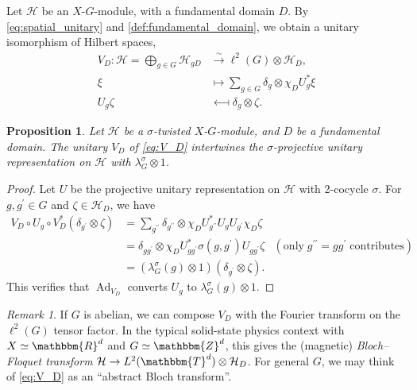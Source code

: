 \documentclass{amsart}
\numberwithin{figure}{section}
\numberwithin{equation}{section}
\numberwithin{table}{section}
\theoremstyle{plain}
\newtheorem{proposition}[equation]{Proposition}
\theoremstyle{definition}
\theoremstyle{remark}
\newtheorem{remark}[equation]{Remark}
\theoremstyle{nonumber}
\newcommand{\Z}{\mathbb{Z}}
\newcommand{\R}{\mathbb{R}}
\newcommand{\T}{\mathbb{T}}
\newcommand{\Ad}{\operatorname{Ad}} %
\renewcommand{\mathbb}{\mathbbm} %
\begin{document}
\medskip
Let \( \mathcal{H} \) be an \( X \)-\( G \)-module,
with a fundamental domain \( D \).
By \eqref{eq:spatial_unitary} and \cref{def:fundamental_domain}, 
we obtain a unitary isomorphism of Hilbert spaces,
\begin{equation}\label{eq:V_D}
\begin{aligned}
V_{D}\colon\mathcal{H}=\bigoplus_{g\in G} \mathcal{H}_{gD}
&\overset{\sim}{\longrightarrow}\ell^2(G)\otimes\mathcal{H}_{D},\\
\xi&\longmapsto
\sum_{g\in G}\delta_g\otimes\chi_{D}U_g^*\xi\\
U_g\zeta &\longmapsfrom \delta_g\otimes\zeta.
\end{aligned}
\end{equation}

\begin{proposition}\label{prop:V_D_intertwine}
Let \( \mathcal{H} \) be a $\sigma$-twisted \( X \)-\( G \)-module, and
$D$ be a fundamental domain. The unitary $V_D$ of \eqref{eq:V_D}
intertwines the $\sigma$-projective unitary representation on $\mathcal{H}$
with $\lambda_G^\sigma\otimes 1$.
\end{proposition}
\begin{proof}
Let $U$ be the projective unitary representation on $\mathcal{H}$ with 2-cocycle $\sigma$.
For $g, g^\prime\in G$ and $\zeta\in \mathcal{H}_D$, we have
\begin{align*}
V_D\circ U_{g}\circ V_D^*(\delta_{g^\prime}\otimes \zeta)
&=\sum_{g^{\prime\prime}}\delta_{g^{\prime\prime}}\otimes\chi_D
U_{g^{\prime\prime}}^*U_gU_{g^\prime}\chi_D\zeta & \\
&=\delta_{g g^\prime}\otimes\chi_D U_{g
g^\prime}^*\sigma(g,g^\prime)U_{gg^\prime}\zeta &
(\mathrm{only}\;g^{\prime\prime}=gg^\prime\;\mathrm{contributes})\\
&=(\lambda_G^\sigma(g)\otimes 1)(\delta_{g^\prime}\otimes\zeta).
\end{align*}
This verifies that $\Ad_{V_D}$ converts $U_g$ to
$\lambda_G^\sigma(g)\otimes 1$.
\end{proof}

\begin{remark}\label{rem:compose.with.Fourier}
If $G$ is abelian, we can compose $V_D$ with the Fourier transform on the
$\ell^2(G)$ tensor factor. In the typical solid-state physics context with
$X\simeq\R^d$ and $G\simeq\Z^d$, this gives the (magnetic)
\emph{Bloch--Floquet transform} $\mathcal{H}\to L^2(\T^d)\otimes
\mathcal{H}_D$. For general $G$, we may think of \eqref{eq:V_D} as an
``abstract Bloch transform''.
\end{remark}
\end{document}
